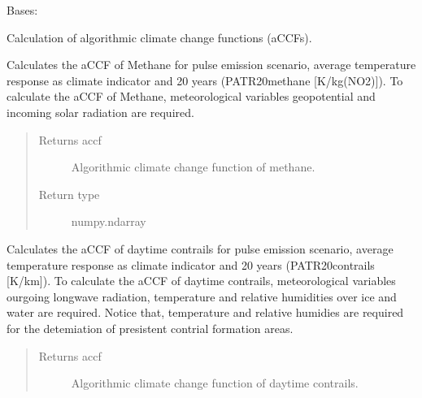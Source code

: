 \documentclass[a4paper,11pt,english]{sphinxmanual}
\begin{document}
\begin{fulllineitems}
\label{\detokenize{envlib:envlib.accf.CalAccf}}
Bases: 

Calculation of algorithmic climate change functions (aCCFs).

\begin{fulllineitems}
\label{\detokenize{envlib:envlib.accf.CalAccf.accf_ch4}}
Calculates the aCCF of Methane for pulse emission scenario, average temperature response as climate
indicator and 20 years (P\sphinxhyphen{}ATR20\sphinxhyphen{}methane {[}K/kg(NO2){]}). To calculate the aCCF of Methane, meteorological
variables geopotential and incoming solar radiation are required.
\begin{quote}\begin{description}
\item[{Returns accf}] \leavevmode
Algorithmic climate change function of methane.

\item[{Return type}] \leavevmode
numpy.ndarray

\end{description}\end{quote}

\end{fulllineitems}


\begin{fulllineitems}
\label{\detokenize{envlib:envlib.accf.CalAccf.accf_dcontrail}}
Calculates the aCCF of day\sphinxhyphen{}time contrails for pulse emission scenario, average temperature response as
climate indicator and 20 years (P\sphinxhyphen{}ATR20\sphinxhyphen{}contrails {[}K/km{]}). To calculate the aCCF of day\sphinxhyphen{}time contrails,
meteorological variables ourgoing longwave radiation, temperature and relative humidities over ice and water
are required. Notice that, temperature and relative humidies are required for the detemiation of presistent
contrial formation areas.
\begin{quote}\begin{description}
\item[{Returns accf}] \leavevmode
Algorithmic climate change function of day\sphinxhyphen{}time contrails.


\end{description}
\end{quote}
\end{fulllineitems}
\end{fulllineitems}
\end{document}
